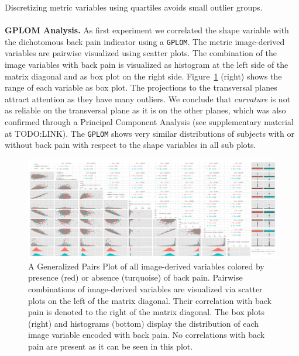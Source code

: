 \documentclass[a4paper,twoside]{style/article}
\begin{document}
Discretizing metric variables using quartiles avoids small outlier groups.
\\\\
\noindent \textbf{GPLOM Analysis.}
As first experiment we correlated the shape variable with the dichotomous back pain indicator using a \texttt{GPLOM}.
The metric image-derived variables are pairwise visualized using scatter plots.
The combination of the image variables with back pain is visualized as histogram at the left side of the matrix diagonal and as box plot on the right side.
Figure~\ref{fig:image-parameter-range} (right) shows the range of each variable as box plot.
The projections to the transversal planes attract attention as they have many outliers.
We conclude that \emph{curvature} is not as reliable on the transversal plane as it is on the other planes, which was also confirmed through a Principal Component Analysis (see supplementary material at TODO:LINK).
The \texttt{GPLOM} shows very similar distributions of subjects with or without back pain with respect to the shape variables in all sub plots.
\begin{figure}[htb]
  \centering
  \includegraphics[width=1.0\textwidth]{figures/image-parameter-range}
  \caption{
A Generalized Pairs Plot of all image-derived variables colored by presence (red) or absence (turquoise) of back pain.
Pairwise combinations of image-derived variables are visualized via scatter plots on the left of the matrix diagonal.
Their correlation with back pain is denoted to the right of the matrix diagonal.
The box plots (right) and histograms (bottom) display the distribution of each image variable encoded with back pain.
No correlations with back pain are present as it can be seen in this plot.
}
  \label{fig:image-parameter-range}
\end{figure}
\end{document}
